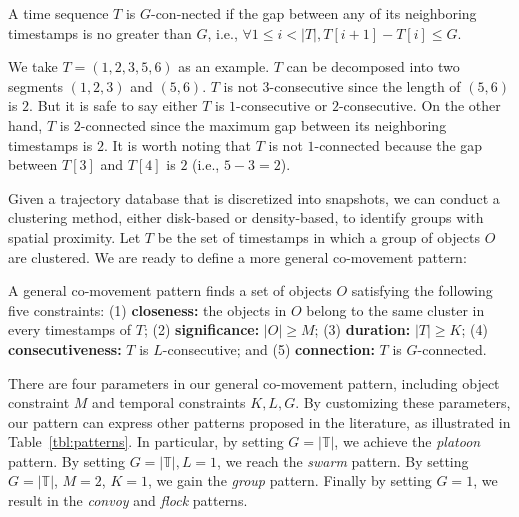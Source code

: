 \begin{definition}[$G$-connected]
A time sequence $T$ is $G$-con-nected if the gap between any of its neighboring timestamps is no greater than $G$, i.e., $\forall 1 \leq i < |T|, T[i+1]-T[i] \leq G$.
\end{definition}

We take $T=(1,2,3,5,6)$ as an example. $T$ can be decomposed into two segments $(1,2,3)$ and $(5,6)$. $T$ is not $3$-consecutive since the length of $(5,6)$ is $2$. But it is safe to say either $T$ is $1$-consecutive or $2$-consecutive. On the other hand, $T$ is $2$-connected since the maximum gap between its neighboring timestamps is $2$. It is worth noting that $T$ is not $1$-connected because the gap between $T[3]$ and $T[4]$ is $2$ (i.e., $5-3=2$).

Given a trajectory database that is discretized into snapshots, we can conduct a clustering method, either disk-based or density-based, to identify groups with spatial proximity. Let $T$ be the set of timestamps in which a group of objects $O$ are clustered. We are ready to define a more general co-movement pattern:
\begin{definition}
A general co-movement pattern finds a set of objects $O$ satisfying the following five constraints: (1) \textbf{closeness:} the objects in $O$ belong to the same cluster in every timestamps of $T$; (2) \textbf{significance:} $|O| \geq M$; (3) \textbf{duration:} $|T| \geq K$; (4) \textbf{consecutiveness:} $T$ is $L$-consecutive; and (5) \textbf{connection:} $T$ is $G$-connected.
\end{definition}
There are four parameters in our general co-movement pattern, including object constraint $M$ and temporal constraints $K,L,G$. 
By customizing these parameters, our pattern can 
express other patterns proposed in the literature, as illustrated in Table~\ref{tbl:patterns}. 
In particular, by setting $G=|\mathbb{T}|$, we achieve the \emph{platoon} pattern. By setting $G=|\mathbb{T}|,L=1$, we reach the \emph{swarm} pattern. By setting $G=|\mathbb{T}|$, $M=2$, $K=1$, we gain the \emph{group} pattern. Finally by setting $G=1$, we result in the \emph{convoy} and \emph{flock} patterns. 
